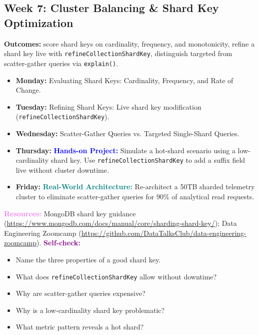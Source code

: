 \documentclass[11pt, a4paper]{article}
\newcommand{\project}[1]{\textbf{\textcolor{blue}{Hands-on Project:}} #1}
\newcommand{\usecase}[1]{\textbf{\textcolor{teal}{Real-World Architecture:}} #1}
\newcommand{\dayitem}[2]{\item \textbf{#1:} #2}
\newcommand{\selfcheck}[1]{\vspace{1mm}\noindent\textbf{\textcolor{purple}{Self-check:}} #1}
\newcommand{\resources}[1]{\vspace{1mm}\noindent\textbf{\textcolor{violet}{Resources:}} #1}
\begin{document}
\subsection*{Week 7: Cluster Balancing \& Shard Key Optimization}
\par\noindent\textbf{Outcomes:} score shard keys on cardinality, frequency, and monotonicity, refine a shard key live with \texttt{refineCollectionShardKey}, distinguish targeted from scatter-gather queries via \texttt{explain()}.
\begin{itemize}[label=-]
    \dayitem{Monday}{Evaluating Shard Keys: Cardinality, Frequency, and Rate of Change.}
    \dayitem{Tuesday}{Refining Shard Keys: Live shard key modification (\texttt{refineCollectionShardKey}).}
    \dayitem{Wednesday}{Scatter-Gather Queries vs. Targeted Single-Shard Queries.}
    \dayitem{Thursday}{\project{Simulate a hot-shard scenario using a low-cardinality shard key. Use \texttt{refineCollectionShardKey} to add a suffix field live without cluster downtime.}}
    \dayitem{Friday}{\usecase{Re-architect a 50TB sharded telemetry cluster to eliminate scatter-gather queries for 90\% of analytical read requests.}}
\end{itemize}
\resources{MongoDB shard key guidance (\url{https://www.mongodb.com/docs/manual/core/sharding-shard-key/}); Data Engineering Zoomcamp (\url{https://github.com/DataTalksClub/data-engineering-zoomcamp}).}
\selfcheck{\begin{itemize}[label=-, itemsep=0pt, leftmargin=1.5em]
    \item Name the three properties of a good shard key.
    \item What does \texttt{refineCollectionShardKey} allow without downtime?
    \item Why are scatter-gather queries expensive?
    \item Why is a low-cardinality shard key problematic?
    \item What metric pattern reveals a hot shard?
\end{itemize}}
\end{document}
